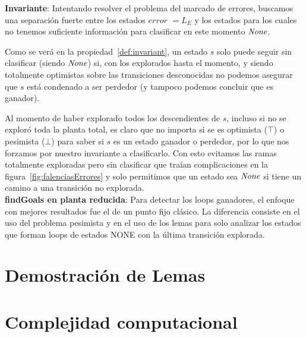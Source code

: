 \textbf{Invariante}: Intentando resolver el problema del marcado de errores, buscamos una separación fuerte entre los estados $error$ $= L_E$ y los estados para los cuales no tenemos suficiente información para clasificar en este momento $\mathit{None}$.

Como se verá en la propiedad~\ref{def:invariant}, un estado $s$ solo puede seguir sin clasificar (siendo $\mathit{None}$) si, con los explorados hasta el momento, y siendo totalmente optimistas sobre las transiciones desconocidas no podemos asegurar que $s$ está condenado a ser perdedor (y tampoco podemos concluir que es ganador).

Al momento de haber explorado todos los descendientes de $s$, incluso si no se exploró toda la planta total, es claro que no importa si se es optimista ($\top$) o pesimista ($\bot$) para saber si $s$ es un estado ganador o perdedor, por lo que nos forzamos por nuestro invariante a clasificarlo. Con esto evitamos las ramas totalmente exploradas pero sin clasificar que traían complicaciones en la figura~\ref{fig:falenciasErrores} y solo permitimos que un estado sea $\mathit{None}$ si tiene un camino a una transición no explorada.\\

\textbf{findGoals en planta reducida}: Para detectar los loops ganadores, el enfoque con mejores resultados fue el de un punto fijo clásico. La diferencia consiste en el uso del problema pesimista y en el uso de los lemas para solo analizar los estados que forman loops de estados NONE con la última transición explorada.

\section{Demostración de Lemas}


\section{Complejidad computacional}



